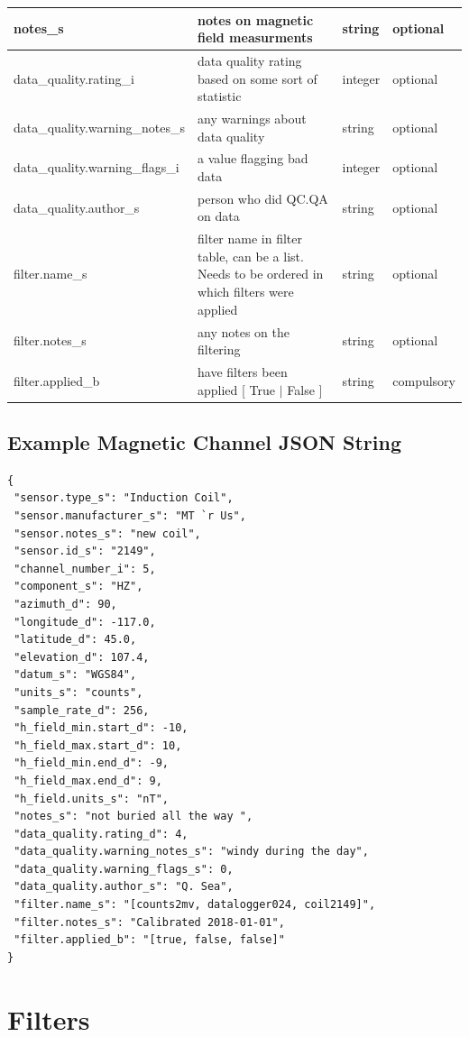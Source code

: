 \documentclass{article}
\begin{document}
\begin{table}[htb!]
\begin{tabular}{|l|p{3in}|l|l|}
		notes\_s & notes on magnetic field measurments & string &  optional \\ \hline
		data\_quality.rating\_i & data quality rating based on some sort of statistic & integer &  optional \\ \hline
		data\_quality.warning\_notes\_s & any warnings about data quality & string &   optional \\ \hline
		data\_quality.warning\_flags\_i & a value flagging bad data  & integer &  optional \\ \hline
		data\_quality.author\_s & person who did QC.QA on data & string &   optional \\ \hline
		filter.name\_s & filter name in filter table, can be a list. Needs to be ordered in which filters were applied & string &  optional \\ \hline
		filter.notes\_s & any notes on the filtering & string &  optional \\ \hline
		filter.applied\_b & have filters been applied [ True $|$ False ] & string & compulsory \\ \hline
		\end{tabular}
	\label{tab:magnetic}
\end{table}

\newpage
\subsection{Example Magnetic Channel JSON String}

\begin{verbatim}
{
 "sensor.type_s": "Induction Coil",
 "sensor.manufacturer_s": "MT `r Us",
 "sensor.notes_s": "new coil",
 "sensor.id_s": "2149",
 "channel_number_i": 5,
 "component_s": "HZ",
 "azimuth_d": 90,
 "longitude_d": -117.0,
 "latitude_d": 45.0,
 "elevation_d": 107.4,
 "datum_s": "WGS84",
 "units_s": "counts",
 "sample_rate_d": 256,
 "h_field_min.start_d": -10,
 "h_field_max.start_d": 10,
 "h_field_min.end_d": -9,
 "h_field_max.end_d": 9,
 "h_field.units_s": "nT",
 "notes_s": "not buried all the way ",
 "data_quality.rating_d": 4,
 "data_quality.warning_notes_s": "windy during the day",
 "data_quality.warning_flags_s": 0,
 "data_quality.author_s": "Q. Sea",
 "filter.name_s": "[counts2mv, datalogger024, coil2149]",
 "filter.notes_s": "Calibrated 2018-01-01",
 "filter.applied_b": "[true, false, false]"
}
\end{verbatim}

\newpage
\section{Filters}
\end{document}
